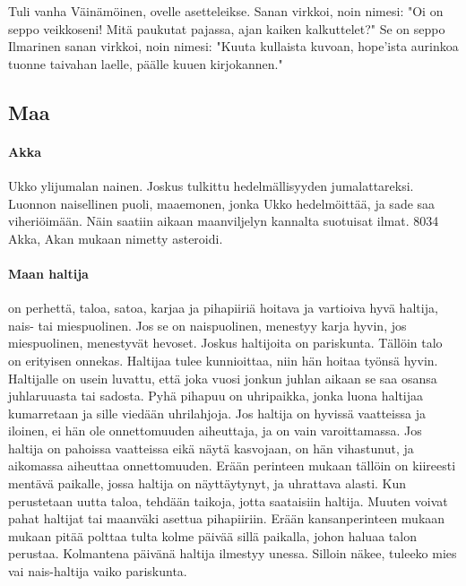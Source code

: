   \begin{em}
    Tuli vanha Väinämöinen, ovelle asetteleikse.
    Sanan virkkoi, noin nimesi: "Oi on seppo veikkoseni!
    Mitä paukutat pajassa, ajan kaiken kalkuttelet?"
    Se on seppo Ilmarinen sanan virkkoi, noin nimesi:
    "Kuuta kullaista kuvoan, hope'ista aurinkoa
    tuonne taivahan laelle, päälle kuuen kirjokannen."
  \end{em}



\subsection{Maa}

  \paragraph{Akka} Ukko ylijumalan nainen. Joskus tulkittu hedelmällisyyden jumalattareksi. Luonnon 
    naisellinen puoli, maaemonen, jonka Ukko hedelmöittää, ja sade saa viheriöimään. Näin saatiin 
    aikaan maanviljelyn kannalta suotuisat ilmat. 8034 Akka, Akan mukaan nimetty asteroidi.
  \paragraph{Maan haltija} on perhettä, taloa, satoa, karjaa ja pihapiiriä hoitava ja vartioiva 
    hyvä haltija, nais- tai miespuolinen. Jos se on naispuolinen, menestyy karja hyvin, jos 
    miespuolinen, menestyvät hevoset. Joskus haltijoita on pariskunta. Tällöin talo on erityisen 
    onnekas. Haltijaa tulee kunnioittaa, niin hän hoitaa työnsä hyvin. Haltijalle on usein 
    luvattu, että joka vuosi jonkun juhlan aikaan se saa osansa juhlaruuasta tai sadosta. Pyhä 
    pihapuu on uhripaikka, jonka luona haltijaa kumarretaan ja sille viedään uhrilahjoja. Jos 
    haltija on hyvissä vaatteissa ja iloinen, ei hän ole onnettomuuden aiheuttaja, ja on vain 
    varoittamassa. Jos haltija on pahoissa vaatteissa eikä näytä kasvojaan, on hän vihastunut, ja 
    aikomassa aiheuttaa onnettomuuden. Erään perinteen mukaan tällöin on kiireesti mentävä 
    paikalle, jossa haltija on näyttäytynyt, ja uhrattava alasti. Kun perustetaan uutta taloa, 
    tehdään taikoja, jotta saataisiin haltija. Muuten voivat pahat haltijat tai maanväki asettua 
    pihapiiriin. Erään kansanperinteen mukaan mukaan pitää polttaa tulta kolme päivää sillä 
    paikalla, johon haluaa talon perustaa. Kolmantena päivänä haltija ilmestyy unessa. Silloin 
    näkee, tuleeko mies vai nais-haltija vaiko pariskunta.  
